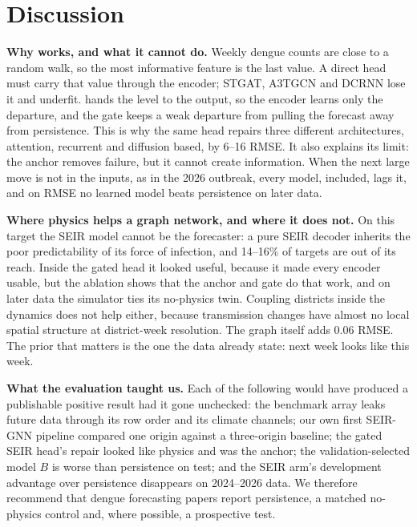 \section{Discussion}
\label{sec:discussion}

\textbf{Why \model{} works, and what it cannot do.} Weekly dengue counts are close to a
random walk, so the most informative feature is the last value. A direct head must
carry that value through the encoder; STGAT, A3TGCN and DCRNN lose it and underfit.
\model{} hands the level to the output, so the encoder learns only the departure, and
the gate keeps a weak departure from pulling the forecast away from persistence. This is
why the same head repairs three different architectures, attention, recurrent and
diffusion based, by 6--16 RMSE. It also explains its limit: the anchor removes failure,
but it cannot create information. When the next large move is not in the inputs, as in
the 2026 outbreak, every model, \model{} included, lags it, and on RMSE no learned model
beats persistence on later data.

\textbf{Where physics helps a graph network, and where it does not.} On this target the
SEIR model cannot be the forecaster: a pure SEIR decoder inherits the poor
predictability of its force of infection, and 14--16\% of targets are out of its reach.
Inside the gated head it looked useful, because it made every encoder usable, but the
ablation shows that the anchor and gate do that work, and on later data the simulator
ties its no-physics twin. Coupling districts inside the dynamics does not help either,
because transmission changes have almost no local spatial structure at district-week
resolution. The graph itself adds 0.06 RMSE. The prior that matters is the one the data
already state: next week looks like this week.

\textbf{What the evaluation taught us.} Each of the following would have produced a
publishable positive result had it gone unchecked: the benchmark array leaks future data
through its row order and its climate channels; our own first SEIR-GNN pipeline compared
one origin against a three-origin baseline; the gated SEIR head's repair looked like
physics and was the anchor; the validation-selected model $B$ is worse than persistence
on test; and the SEIR arm's development advantage over persistence disappears on
2024--2026 data. We therefore recommend that dengue forecasting papers report
persistence, a matched no-physics control and, where possible, a prospective test.

